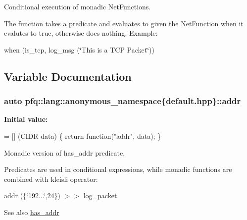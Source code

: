 Conditional execution of monadic Net\+Functions. 

The function takes a predicate and evaluates to given the Net\+Function when it evalutes to {\ttfamily true}, otherwise does nothing. Example\+:

when (is\+\_\+tcp, log\+\_\+msg (\char`\"{}\+This is a T\+C\+P Packet\char`\"{})) 

\subsection{Variable Documentation}
\subsubsection[{\texorpdfstring{addr}{addr}}]{\setlength{\rightskip}{0pt plus 5cm}auto pfq\+::lang\+::anonymous\+\_\+namespace\{default.\+hpp\}\+::addr}\hypertarget{namespacepfq_1_1lang_1_1anonymous__namespace_02default_8hpp_03_a13cabe468839119d8d68540e3c60718b}{}\label{namespacepfq_1_1lang_1_1anonymous__namespace_02default_8hpp_03_a13cabe468839119d8d68540e3c60718b}
{\bfseries Initial value\+:}
\begin{DoxyCode}
= [] (CIDR data)
        \{
            \textcolor{keywordflow}{return} \textcolor{keyword}{function}(\textcolor{stringliteral}{"addr"}, data);
        \}
\end{DoxyCode}


Monadic version of {\ttfamily has\+\_\+addr} predicate. 

Predicates are used in conditional expressions, while monadic functions are combined with kleisli operator\+:

addr (\{\char`\"{}192...\char`\"{},24\}) $>$$>$ log\+\_\+packet

\begin{DoxySeeAlso}{See also}
\hyperlink{namespacepfq_1_1lang_1_1anonymous__namespace_02default_8hpp_03_a74c6b7e812fb3d312ebf534960a6a91d}{has\+\_\+addr} 
\end{DoxySeeAlso}
